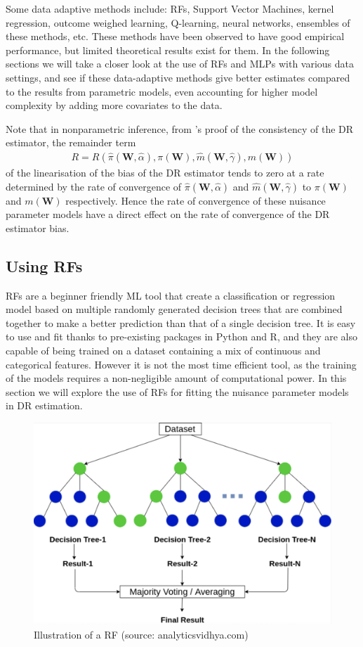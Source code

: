 \documentclass[12pt,twoside]{article}
\begin{document}
Some data adaptive methods include: RFs, Support Vector Machines, kernel regression, outcome weighed learning, Q-learning, neural networks, ensembles of these methods, etc. These methods have been observed to have good empirical performance, but limited theoretical results exist for them. In the following sections we will take a closer look at the use of RFs and MLPs with various data settings, and see if these data-adaptive methods give better estimates compared to the results from parametric models, even accounting for higher model complexity by adding more covariates to the data.

Note that in nonparametric inference, from \cite{benkeser2017}'s proof of the consistency of the DR estimator, the remainder term 
\begin{align*}
R = R(\hat\pi(\mathbf{W},\hat{\alpha}), \pi(\mathbf{W}), \hat m(\mathbf{W}, \hat\gamma), m(\mathbf{W}))
\end{align*}
of the linearisation of the bias of the DR estimator tends to zero at a rate determined by the rate of convergence of  $\hat\pi(\mathbf{W},\hat{\alpha})$ and  $\hat m(\mathbf{W}, \hat\gamma)$ to $\pi(\mathbf{W})$ and $m(\mathbf{W})$ respectively. Hence the rate of convergence of these nuisance parameter models have a direct effect on the rate of convergence of the DR estimator bias.

\subsection{Using RFs}

RFs are a beginner friendly ML tool that create a classification or regression model based on multiple randomly generated decision trees that are combined together to make a better prediction than that of a single decision tree. It is easy to use and fit thanks to pre-existing packages in Python and R, and they are also capable of being trained on a dataset containing a mix of continuous and categorical features. However it is not the most time efficient tool, as the training of the models requires a non-negligible amount of computational power. In this section we will explore the use of RFs for fitting the nuisance parameter models in DR estimation.

\begin{figure}
    \centering
    \includegraphics[width = 0.7\columnwidth]{figures/tree.png}
    \caption{Illustration of a RF (source: analyticsvidhya.com)}
    \label{fig:my_label}
\end{figure}
\end{document}
